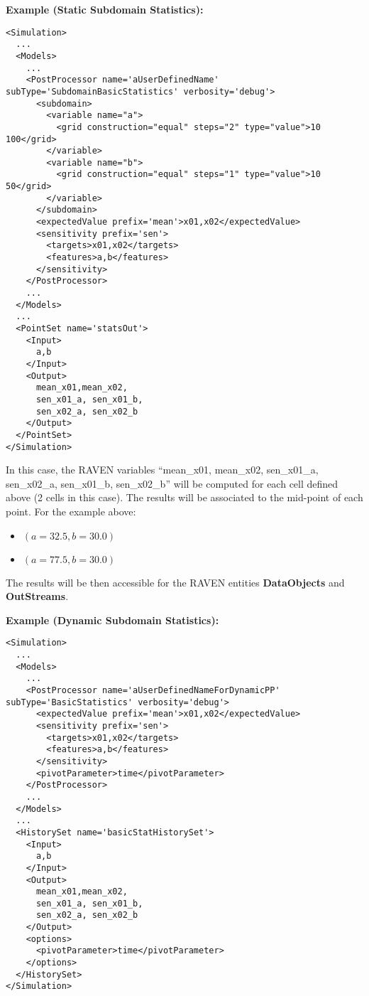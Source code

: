 \textbf{Example (Static Subdomain Statistics):}
\begin{lstlisting}[style=XML,morekeywords={name,subType,debug}]
<Simulation>
  ...
  <Models>
    ...
    <PostProcessor name='aUserDefinedName' subType='SubdomainBasicStatistics' verbosity='debug'>
      <subdomain>
        <variable name="a">
          <grid construction="equal" steps="2" type="value">10 100</grid>
        </variable>
        <variable name="b">
          <grid construction="equal" steps="1" type="value">10 50</grid>
        </variable>
      </subdomain>
      <expectedValue prefix='mean'>x01,x02</expectedValue>
      <sensitivity prefix='sen'>
        <targets>x01,x02</targets>
        <features>a,b</features>
      </sensitivity>
    </PostProcessor>
    ...
  </Models>
  ...
  <PointSet name='statsOut'>
    <Input>
      a,b
    </Input>
    <Output>
      mean_x01,mean_x02,
      sen_x01_a, sen_x01_b,
      sen_x02_a, sen_x02_b
    </Output>
  </PointSet>
</Simulation>
\end{lstlisting}

In this case, the RAVEN variables ``mean\_x01, mean\_x02, sen\_x01\_a, sen\_x02\_a, sen\_x01\_b, sen\_x02\_b''
will be computed for each cell defined above (2 cells in this case).
The results will be associated to the mid-point of each point. For the example above:
\begin{itemize}
 \item $(a=32.5,b=30.0)$
 \item $(a=77.5,b=30.0)$
\end{itemize}
The results will be then accessible for the RAVEN entities \textbf{DataObjects} and \textbf{OutStreams}.

\textbf{Example (Dynamic Subdomain Statistics):}

\begin{lstlisting}[style=XML,morekeywords={name,subType,debug}]
<Simulation>
  ...
  <Models>
    ...
    <PostProcessor name='aUserDefinedNameForDynamicPP' subType='BasicStatistics' verbosity='debug'>
      <expectedValue prefix='mean'>x01,x02</expectedValue>
      <sensitivity prefix='sen'>
        <targets>x01,x02</targets>
        <features>a,b</features>
      </sensitivity>
      <pivotParameter>time</pivotParameter>
    </PostProcessor>
    ...
  </Models>
  ...
  <HistorySet name='basicStatHistorySet'>
    <Input>
      a,b
    </Input>
    <Output>
      mean_x01,mean_x02,
      sen_x01_a, sen_x01_b,
      sen_x02_a, sen_x02_b
    </Output>
    <options>
      <pivotParameter>time</pivotParameter>
    </options>
  </HistorySet>
</Simulation>
\end{lstlisting}


